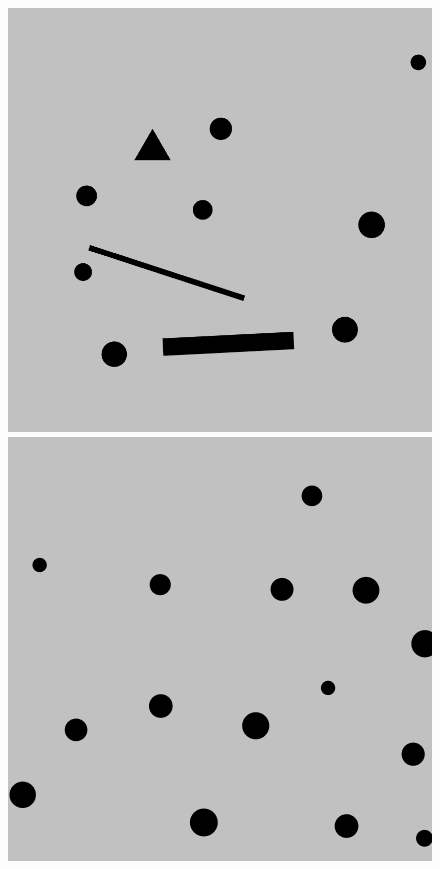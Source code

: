 \documentclass{beamer}
\begin{document}
\begin{frame}
\begin{figure}[H]
\begin{columns}
\begin{column}{0.14\textwidth}
							\includegraphics[width=1\linewidth]{graphics/test_model_11_5.png}
							\includegraphics[width=1\linewidth]{graphics/test_model_15_5.png}
						\end{column}

\end{columns}
\end{figure}
\end{frame}
\end{document}
